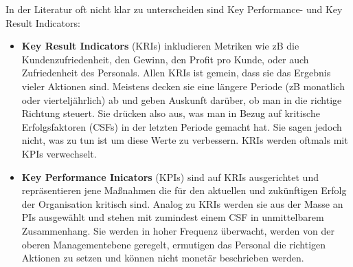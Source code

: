 In der Literatur oft nicht klar zu unterscheiden sind Key Performance- und Key Result Indicators:
\begin{itemize}
 \itemsep-8pt
 \item \textbf{Key Result Indicators} (KRIs) inkludieren Metriken wie zB die Kundenzufriedenheit, den Gewinn, den Profit pro Kunde, oder auch Zufriedenheit des Personals. Allen KRIs ist gemein, dass sie das Ergebnis vieler Aktionen sind. Meistens decken sie eine längere Periode (zB monatlich oder vierteljährlich) ab und geben Auskunft darüber, ob man in die richtige Richtung steuert. Sie drücken also aus, was man in Bezug auf kritische Erfolgsfaktoren (CSFs) in der letzten Periode gemacht hat. Sie sagen jedoch nicht, was zu tun ist um diese Werte zu verbessern. KRIs werden oftmals mit KPIs verwechselt.

 \item \textbf{Key Performance Inicators} (KPIs) sind auf KRIs ausgerichtet und repräsentieren jene Maßnahmen die für den aktuellen und zukünftigen Erfolg der Organisation kritisch sind. Analog zu KRIs werden sie aus der Masse an PIs ausgewählt und stehen mit zumindest einem CSF in unmittelbarem Zusammenhang. Sie werden in hoher Frequenz überwacht, werden von der oberen Managementebene geregelt, ermutigen das Personal die richtigen Aktionen zu setzen und können nicht monetär beschrieben werden.

\end{itemize}


